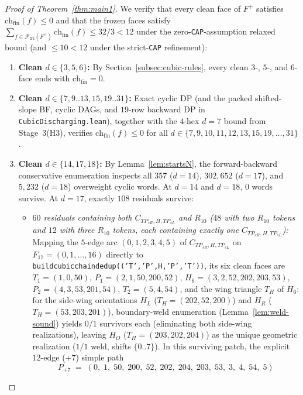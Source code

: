 \documentclass[11pt,reqno]{amsart}
\theoremstyle{plain}
\theoremstyle{definition}
\theoremstyle{remark}
\newcommand{\chf}{\mathrm{ch}_{\mathrm{fin}}}
\newcommand{\Ffrz}{\mathcal{F}_{\mathrm{frz}}}
\DeclareRobustCommand{\_}{\ifmmode\text{\textunderscore}\else\textunderscore\allowbreak\fi}
\begin{document}
\begin{proof}[Proof of Theorem~\ref{thm:main1}]
We verify that every clean face of $F^+$ satisfies $\chf(f) \le 0$ and that the frozen faces satisfy $\sum_{f \in \Ffrz(F^+)} \chf(f) \le 32/3 < 12$ under the zero-\texttt{CAP}-assumption relaxed bound (and $\le 10 < 12$ under the strict-\texttt{CAP} refinement):
\begin{enumerate}[label=(\arabic*),leftmargin=2.2em]
  \item \textbf{Clean $d \in \{3, 5, 6\}$:} By Section~\ref{subsec:cubic-rules}, every clean $3$-, $5$-, and $6$-face ends with $\chf = 0$.
  \item \textbf{Clean $d \in \{7, 9..13, 15, 19..31\}$:} Exact cyclic DP (and the packed shifted-slope BF, cyclic DAGs, and $19$-row backward DP in \texttt{CubicDischarging.lean}), together with the $4$-hex $d=7$ bound from Stage~3(H3), verifies $\chf(f) \le 0$ for all $d \in \{7, 9, 10, 11, 12, 13, 15, 19, \dots, 31\}$.
  \item \textbf{Clean $d \in \{14, 17, 18\}$:} By Lemma~\ref{lem:startsN}, the forward-backward conservative enumeration inspects all $357$ ($d=14$), $302{,}652$ ($d=17$), and $5{,}232$ ($d=18$) overweight cyclic words. At $d = 14$ and $d = 18$, $0$ words survive. At $d = 17$, exactly $108$ residuals survive:
  \begin{itemize}[leftmargin=1.5em]
    \item \emph{$60$ residuals containing both $C_{TP_{sR}, H, TP_{sL}}$ and $R_{10}$ ($48$ with two $R_{10}$ tokens and $12$ with three $R_{10}$ tokens, each containing exactly one $C_{TP_{sR}, H, TP_{sL}}$):} Mapping the $5$-edge arc $(0, 1, 2, 3, 4, 5)$ of $C_{TP_{sR}, H, TP_{sL}}$ on $F_{17} = (0, 1, \dots, 16)$ directly to \texttt{build\_cubic\_chain\_dedup(('T',\allowbreak'P',\allowbreak H,\allowbreak'P',\allowbreak'T'))}, its six clean faces are $T_1 = (1,0,50)$, $P_1 = (2,1,50,200,52)$, $H_6 = (3,2,52,202,203,53)$, $P_2 = (4,3,53,201,54)$, $T_2 = (5,4,54)$, and the wing triangle $T_H$ of $H_6$: for the side-wing orientations $H_L$ ($T_H = (202, 52, 200)$) and $H_R$ ($T_H = (53, 203, 201)$), boundary-weld enumeration (Lemma~\ref{lem:weld-sound}) yields $0/1$ survivors each (eliminating both side-wing realizations), leaving $H_O$ ($T_H = (203, 202, 204)$) as the unique geometric realization ($1/1$ weld, shifts $\{0..7\}$). In this surviving patch, the explicit $12$-edge ($+7$) simple path
    \[
      P_{+7} \;=\; (0,\; 1,\; 50,\; 200,\; 52,\; 202,\; 204,\; 203,\; 53,\; 3,\; 4,\; 54,\; 5)
    \]

\end{itemize}
\end{enumerate}
\end{proof}
\end{document}
